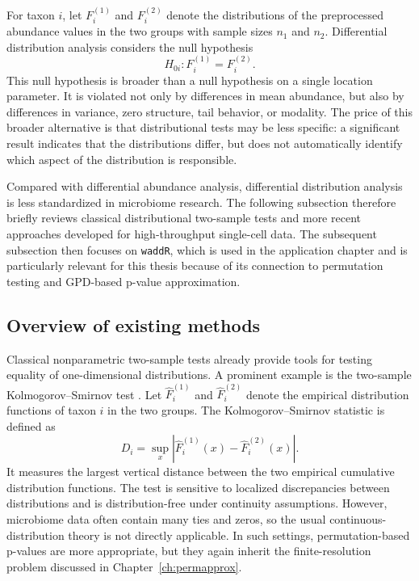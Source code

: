 For taxon $i$, let $F_i^{(1)}$ and $F_i^{(2)}$ denote the distributions of the preprocessed abundance values in the two groups with sample sizes $n_1$ and $n_2$. Differential distribution analysis considers the null hypothesis
\begin{equation}
\label{eq:4feature:diffdist_null}
H_{0i}: F_i^{(1)} = F_i^{(2)}.
\end{equation}
This null hypothesis is broader than a null hypothesis on a single location parameter. It is violated not only by differences in mean abundance, but also by differences in variance, zero structure, tail behavior, or modality. The price of this broader alternative is that distributional tests may be less specific: a significant result indicates that the distributions differ, but does not automatically identify which aspect of the distribution is responsible.

Compared with differential abundance analysis, differential distribution analysis is less standardized in microbiome research. The following subsection therefore briefly reviews classical distributional two-sample tests and more recent approaches developed for high-throughput single-cell data. The subsequent subsection then focuses on \texttt{waddR}, which is used in the application chapter and is particularly relevant for this thesis because of its connection to permutation testing and GPD-based p-value approximation.

\subsection{Overview of existing methods}
\label{sec:4feature:diffdist_overview}

Classical nonparametric two-sample tests already provide tools for testing equality of one-dimensional distributions. A prominent example is the two-sample Kolmogorov--Smirnov test \citep{kolmogorov1933sulla,smirnov1948table}. Let $\hat F_i^{(1)}$ and $\hat F_i^{(2)}$ denote the empirical distribution functions of taxon $i$ in the two groups. The Kolmogorov--Smirnov statistic is defined as
\begin{equation}
\label{eq:ks_statistic}
D_i = \sup_x \left| \hat F_i^{(1)}(x) - \hat F_i^{(2)}(x) \right|.
\end{equation}
It measures the largest vertical distance between the two empirical cumulative distribution functions. The test is sensitive to localized discrepancies between distributions and is distribution-free under continuity assumptions. However, microbiome data often contain many ties and zeros, so the usual continuous-distribution theory is not directly applicable. In such settings, permutation-based p-values are more appropriate, but they again inherit the finite-resolution problem discussed in Chapter~\ref{ch:permapprox}.

